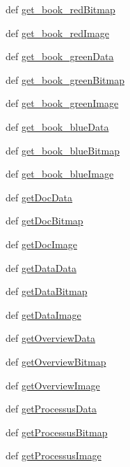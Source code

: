 \begin{DoxyCompactItemize}
def \hyperlink{namespaceimages_a161528173597fb1e6af175657d2fe859}{get\_\-book\_\-redBitmap}
\item 
def \hyperlink{namespaceimages_ae4811d3d4d89d25e5855e4c5bdfff315}{get\_\-book\_\-redImage}
\item 
def \hyperlink{namespaceimages_af0431269fe4a06cfc32baca55c2f4878}{get\_\-book\_\-greenData}
\item 
def \hyperlink{namespaceimages_a0d6123d722de67b8e190f263755b3aa9}{get\_\-book\_\-greenBitmap}
\item 
def \hyperlink{namespaceimages_a52a1ffb6be7ccd278a4a87f926fec115}{get\_\-book\_\-greenImage}
\item 
def \hyperlink{namespaceimages_ad11439024a6dc7a18e34b18a3e3a0685}{get\_\-book\_\-blueData}
\item 
def \hyperlink{namespaceimages_abcb73009bbb67720466d628633a1cbf1}{get\_\-book\_\-blueBitmap}
\item 
def \hyperlink{namespaceimages_a6f449fcb3d1bf89598ed1c71869f2be2}{get\_\-book\_\-blueImage}
\item 
def \hyperlink{namespaceimages_a631eb8b7fd9b619029c58b8e38af8d17}{getDocData}
\item 
def \hyperlink{namespaceimages_a7dd423f0aeac399629bb5bf6bc529cdf}{getDocBitmap}
\item 
def \hyperlink{namespaceimages_a24f600467460cdd78c3c74726338bb02}{getDocImage}
\item 
def \hyperlink{namespaceimages_a80e3b05a03298099fa80dc089e70f9a1}{getDataData}
\item 
def \hyperlink{namespaceimages_abecf299bad6e0ab162fbfc417b04fe01}{getDataBitmap}
\item 
def \hyperlink{namespaceimages_afa1aab9f04bf813e7908feb50f15bb7a}{getDataImage}
\item 
def \hyperlink{namespaceimages_a13b9494563db4c8b693ab412bb4bb55f}{getOverviewData}
\item 
def \hyperlink{namespaceimages_a40a5d6667ca07bd047b635de4cd5c00e}{getOverviewBitmap}
\item 
def \hyperlink{namespaceimages_ad79e773fdb6dbdc67ae408cc098622b4}{getOverviewImage}
\item 
def \hyperlink{namespaceimages_af0777d8bd35515dc100a0d22f6f3ac91}{getProcessusData}
\item 
def \hyperlink{namespaceimages_ab7956d30ef7893df7f99a09d1ac64153}{getProcessusBitmap}
\item 
def \hyperlink{namespaceimages_a604e28eb031db983c8e0d88a942b2496}{getProcessusImage}

\end{DoxyCompactItemize}
